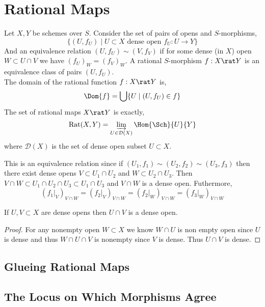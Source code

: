 \documentclass[12pt]{article}
\begin{document}
\section{Rational Maps}

\begin{definition}
Let $X, Y$ be schemes over $S$. Consider the set of pairs of opens and $S$-morphisms,
\[ \{ (U, f_U) \mid U \subset X \text{ dense open } f_U : U \to Y \} \]
And an equivalence relation $(U, f_U) \sim (V, f_V)$ if for some dense (in $X$) open $W \subset U \cap V$ we have $(f_U)_{W} = (f_V)_{W}$. A rational $S$-morphism $f : X \rat Y$ is an equivalence class of pairs $(U, f_U)$. 
\bigskip\\
The domain of the rational function $f : X \rat Y$ is,
\[ \Dom{f} = \bigcup \{ U \mid (U, f_U) \in f \} \]
The set of rational maps $X \rat Y$ is exactly,
\[ \mathrm{Rat}(X, Y) = \varinjlim_{U \in \mathcal{D}(X)} \Hom{\Sch}{U}{Y} \]
where $\mathcal{D}(X)$ is the set of dense open subset $U \subset X$.
\end{definition}

\begin{remark}
This is an equivalence relation since if $(U_1, f_1) \sim (U_2, f_2) \sim (U_3, f_3)$ then there exist dense opens $V \subset U_1 \cap U_2$ and $W \subset U_2 \cap U_3$. Then $V \cap W \subset U_1 \cap U_2 \cap U_3 \subset U_1 \cap U_3$ and $V \cap W$ is a dense open. Futhermore,
\[ (f_1|_{V})_{V \cap W} = (f_2|_{V})_{V \cap W} = (f_2|_{W})_{V \cap W} = (f_3|_{W})_{V \cap W} \]
\end{remark}

\begin{lemma}
If $U, V \subset X$ are dense opens then $U \cap V$ is a dense open.
\end{lemma}

\begin{proof}
For any nonempty open $W \subset X$ we know $W \cap U$ is non empty open since $U$ is dense and thus $W \cap U \cap V$ is nonempty since $V$ is dense. Thus $U \cap V$ is dense. 
\end{proof}

\subsection{Glueing Rational Maps}

\subsection{The Locus on Which Morphisms Agree}
\end{document}
